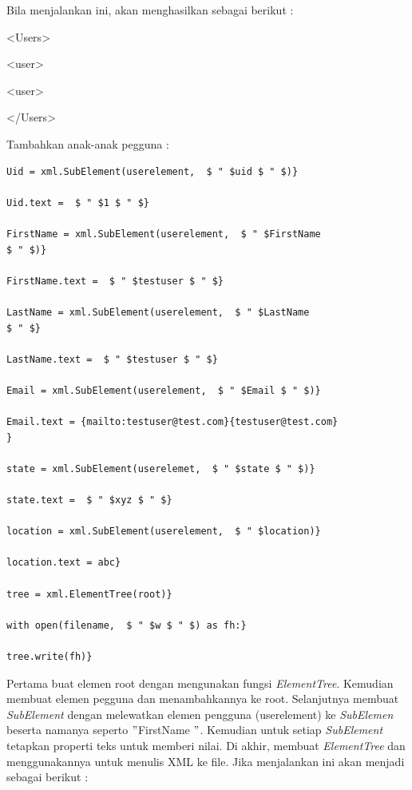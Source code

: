 \vspace{10pt}
Bila menjalankan ini, akan menghasilkan sebagai berikut : 
 
{\fontsize{10pt}{10pt}\selectfont <Users>} 
 
{\fontsize{10pt}{10pt}\selectfont  \hspace*{0.5in} <user>} 
 
{\fontsize{10pt}{10pt}\selectfont  \hspace*{0.5in} <user>} 
 
{\fontsize{10pt}{10pt}\selectfont </Users>} 


\vspace{50pt} 
Tambahkan anak-anak pegguna :
\begin{verbatim} 
Uid = xml.SubElement(userelement,  $ " $uid $ " $)} 
 
Uid.text =  $ " $1 $ " $} 
 
FirstName = xml.SubElement(userelement,  $ " $FirstName 
$ " $)} 
 
FirstName.text =  $ " $testuser $ " $} 
 
LastName = xml.SubElement(userelement,  $ " $LastName
$ " $} 
 
LastName.text =  $ " $testuser $ " $} 
 
Email = xml.SubElement(userelement,  $ " $Email $ " $)} 
 
Email.text = {mailto:testuser@test.com}{testuser@test.com}
} 
 
state = xml.SubElement(userelemet,  $ " $state $ " $)} 
 
state.text =  $ " $xyz $ " $} 
 
location = xml.SubElement(userelement,  $ " $location)} 
 
location.text = abc} 
 
tree = xml.ElementTree(root)} 
 
with open(filename,  $ " $w $ " $) as fh:} 
 
tree.write(fh)} 
\end{verbatim}

\vspace{12pt}
\hspace*{0.5in} Pertama buat elemen root dengan mengunakan fungsi \textit{ElementTree}. Kemudian membuat elemen pegguna dan menambahkannya ke root. Selanjutnya membuat \textit{SubElement }dengan melewatkan elemen pengguna (userelement) ke \textit{SubElemen} beserta namanya seperto  $ " $FirstName $ " $. Kemudian untuk setiap \textit{SubElement} tetapkan properti teks untuk memberi nilai. Di akhir, membuat \textit{ElementTree} dan menggunakannya untuk menulis XML ke file.  Jika menjalankan ini akan menjadi sebagai berikut : 
 
